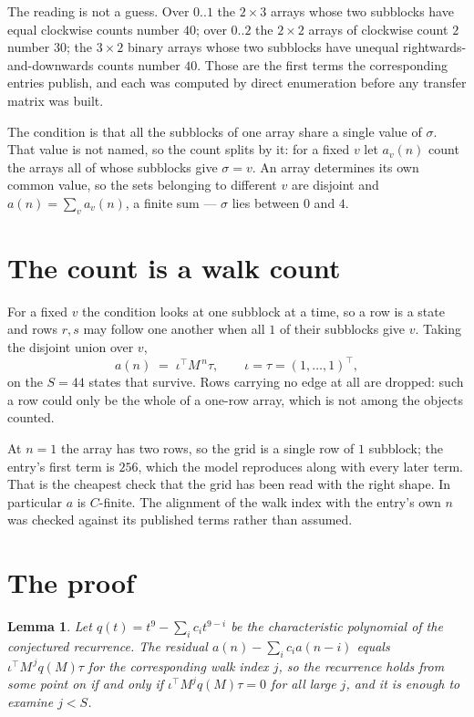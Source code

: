 \documentclass[11pt,a4paper]{article}
\theoremstyle{plain}
\newtheorem{lemma}[theorem]{Lemma}
\theoremstyle{definition}
\begin{document}
The reading is not a guess. Over $0..1$ the $2\times3$ arrays whose two subblocks have equal
clockwise counts number $40$; over $0..2$ the $2\times2$ arrays of clockwise count $2$ number
$30$; the $3\times2$ binary arrays whose two subblocks have unequal rightwards-and-downwards
counts number $40$. Those are the first terms the corresponding entries publish, and each was
computed by direct enumeration before any transfer matrix was built.

The condition is that all the subblocks of one array share a single value of $\sigma$. That
value is not named, so the count splits by it: for a fixed $v$ let $a_v(n)$ count the arrays all
of whose subblocks give $\sigma=v$. An array determines its own common value, so the sets
belonging to different $v$ are disjoint and $a(n)=\sum_v a_v(n)$, a finite sum --- $\sigma$
lies between $0$ and $4$.

\section{The count is a walk count}

For a fixed $v$ the condition looks at one subblock at a time, so a row is
a state and rows $r,s$ may follow one another when all $1$ of their subblocks give $v$.
Taking the disjoint union over $v$,
\[
a(n)\;=\;\iota^{\!\top}M^{\,n}\tau,\qquad\iota=\tau=(1,\dots,1)^{\!\top},
\]
on the $S=44$ states that survive. Rows carrying no edge at all are dropped: such a row could
only be the whole of a one-row array, which is not among the objects counted.

At $n=1$ the array has two rows, so the grid is a single row of $1$
subblock; the entry's first term is $256$, which the model
reproduces along with every later term. That is the cheapest check that the grid has been read
with the right shape.
In particular $a$ is $C$-finite. The alignment of the walk index with the entry's own $n$ was
checked against its published terms rather than assumed.

\section{The proof}

\begin{lemma}\label{lem:crit}
Let $q(t)=t^{9}-\sum_i c_it^{9-i}$ be the characteristic polynomial of the
conjectured recurrence. The residual $a(n)-\sum_ic_ia(n-i)$ equals
$\iota^{\!\top}M^{\,j}q(M)\tau$ for the corresponding walk index $j$, so the recurrence
holds from some point on if and only if $\iota^{\!\top}M^{j}q(M)\tau=0$ for all large $j$,
and it is enough to examine $j<S$.
\end{lemma}
\end{document}
